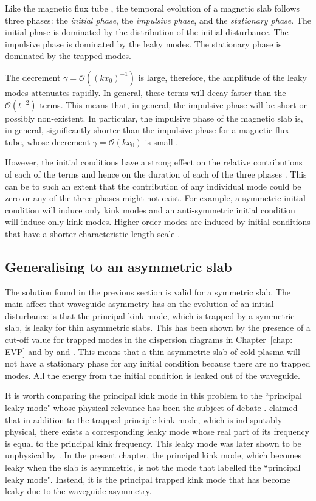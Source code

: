 Like the magnetic flux tube \citep{rud_etal06b,ter_etal06}, the temporal evolution of a magnetic slab follows three phases: the \textit{initial phase}, the \textit{impulsive phase}, and the \textit{stationary phase}. The initial phase is dominated by the distribution of the initial disturbance. The impulsive phase is dominated by the leaky modes. The stationary phase is dominated by the trapped modes.

The decrement $\gamma = \mathcal{O}((kx_0)^{-1})$ is large, therefore, the amplitude of the leaky modes attenuates rapidly. In general, these terms will decay faster than the $\mathcal{O}(t^{-2})$ terms. This means that, in general, the impulsive phase will be short or possibly non-existent. In particular, the impulsive phase of the magnetic slab is, in general, significantly shorter than the impulsive phase for a magnetic flux tube, whose decrement $\gamma = \mathcal{O}(kx_0)$ is small \citep{rud_etal06b}.

However, the initial conditions have a strong effect on the relative contributions of each of the terms and hence on the duration of each of the three phases \citep{ter_etal06,ter_etal07}. This can be to such an extent that the contribution of any individual mode could be zero or any of the three phases might not exist. For example, a symmetric initial condition will induce only kink modes and an anti-symmetric initial condition will induce only kink modes. Higher order modes are induced by initial conditions that have a shorter characteristic length scale \citep{ter_etal07}.


\subsection{Generalising to an asymmetric slab} \label{sec: generalising to asym slab}
The solution found in the previous section is valid for a symmetric slab. The main affect that waveguide asymmetry has on the evolution of an initial disturbance is that the principal kink mode, which is trapped by a symmetric slab, is leaky for thin asymmetric slabs. This has been shown by the presence of a cut-off value for trapped modes in the dispersion diagrams in Chapter~\ref{chap: EVP} and by \cite{all_etal17} and \cite{zsa_etal18}. This means that a thin asymmetric slab of cold plasma will not have a stationary phase for any initial condition because there are no trapped modes. All the energy from the initial condition is leaked out of the waveguide.

It is worth comparing the principal kink mode in this problem to the ``principal leaky mode" whose physical relevance has been the subject of debate \citep{cal03,rud_etal06b,cal06,rud_etal06}. \cite{cal03} claimed that in addition to the trapped principle kink mode, which is indisputably physical, there exists a corresponding leaky mode whose real part of its frequency is equal to the principal kink frequency. This leaky mode was later shown to be unphysical by \cite{rud_etal06b}. In the present chapter, the principal kink mode, which becomes leaky when the slab is asymmetric, is not the mode that \cite{cal03} labelled the ``principal leaky mode". Instead, it is the principal trapped kink mode that has become leaky due to the waveguide asymmetry.


